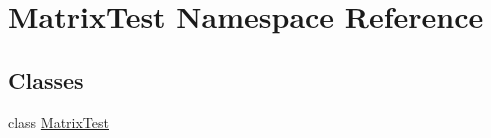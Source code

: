 \hypertarget{namespace_matrix_test}{}\section{Matrix\+Test Namespace Reference}
\label{namespace_matrix_test}
\subsection*{Classes}
\begin{DoxyCompactItemize}
\item 
class \mbox{\hyperlink{class_matrix_test_1_1_matrix_test}{Matrix\+Test}}
\end{DoxyCompactItemize}
